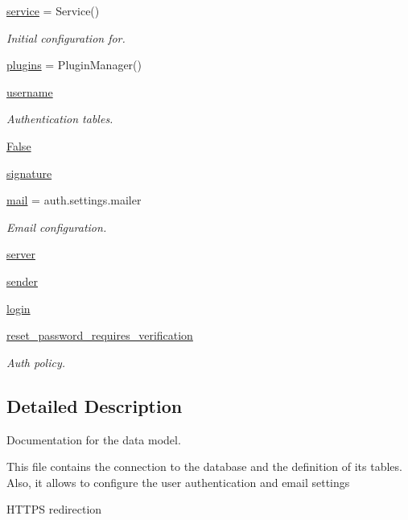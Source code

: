 \begin{DoxyCompactItemize}
\hyperlink{namespacedb_a60ddb7c313ec8a2276261b95e67ca070}{service} = Service()
\begin{DoxyCompactList}\small\item\em Initial configuration for. \end{DoxyCompactList}\item 
\hyperlink{namespacedb_ac705c267ea1320a8ff7a148e19fc1bf7}{plugins} = Plugin\+Manager()
\item 
\hyperlink{namespacedb_a470a73a6c9e7b643e5c6a9ba1b90755e}{username}
\begin{DoxyCompactList}\small\item\em Authentication tables. \end{DoxyCompactList}\item 
\hyperlink{namespacedb_aa87a451fde49f3d7dcb13435106b4335}{False}
\item 
\hyperlink{namespacedb_ac3b13438d27630fea8f9cbb643fd59f0}{signature}
\item 
\hyperlink{namespacedb_a39b72c0590643b096fd9f1429761100e}{mail} = auth.\+settings.\+mailer
\begin{DoxyCompactList}\small\item\em Email configuration. \end{DoxyCompactList}\item 
\hyperlink{namespacedb_a83850ad9c01b1355d91e442407781570}{server}
\item 
\hyperlink{namespacedb_a0389358465df21506bd70f938441160f}{sender}
\item 
\hyperlink{namespacedb_a1b7fdd513c47aa3ec333ec122eaa392f}{login}
\item 
\hyperlink{namespacedb_af315823f11d44ccb217606f97edea193}{reset\+\_\+password\+\_\+requires\+\_\+verification}
\begin{DoxyCompactList}\small\item\em Auth policy. \end{DoxyCompactList}\end{DoxyCompactItemize}


\subsection{Detailed Description}
Documentation for the data model. 

This file contains the connection to the database and the definition of its tables. Also, it allows to configure the user authentication and email settings

H\+T\+T\+PS redirection

